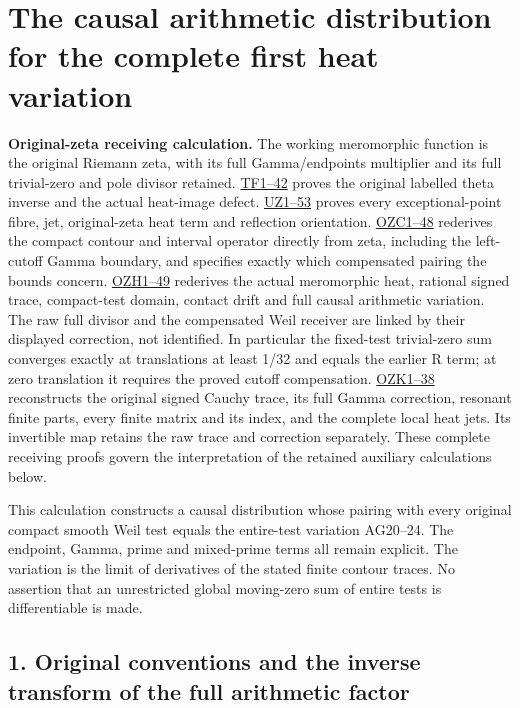\documentclass[
  10pt,
  a4paper,
]{article}
\author{}
\date{}
\begin{document}
{
\setcounter{tocdepth}{3}
\tableofcontents
}
\section{The causal arithmetic distribution for the complete first heat
variation}\label{the-causal-arithmetic-distribution-for-the-complete-first-heat-variation}

\textbf{Original-zeta receiving calculation.} The working meromorphic
function is the original Riemann zeta, with its full Gamma/endpoints
multiplier and its full trivial-zero and pole divisor retained.
\href{FAITHFUL_THETA_COMPLETION_RETURN.md}{TF1--42} proves the original
labelled theta inverse and the actual heat-image defect.
\href{FAITHFUL_UNCOMPLETED_ZETA_HEAT.md}{UZ1--53} proves every
exceptional-point fibre, jet, original-zeta heat term and reflection
orientation.
\href{ORIGINAL_ZETA_COMPACT_WEIL_RECONSTRUCTION.md}{OZC1--48} rederives
the compact contour and interval operator directly from zeta, including
the left-cutoff Gamma boundary, and specifies exactly which compensated
pairing the bounds concern.
\href{ORIGINAL_ZETA_HEAT_CONTACT_RECONSTRUCTION.md}{OZH1--49} rederives
the actual meromorphic heat, rational signed trace, compact-test domain,
contact drift and full causal arithmetic variation. The raw full divisor
and the compensated Weil receiver are linked by their displayed
correction, not identified. In particular the fixed-test trivial-zero
sum converges exactly at translations at least 1/32 and equals the
earlier R term; at zero translation it requires the proved cutoff
compensation. \href{ORIGINAL_ZETA_CAUCHY_RECONSTRUCTION.md}{OZK1--38}
reconstructs the original signed Cauchy trace, its full Gamma
correction, resonant finite parts, every finite matrix and its index,
and the complete local heat jets. Its invertible map retains the raw
trace and correction separately. These complete receiving proofs govern
the interpretation of the retained auxiliary calculations below.

This calculation constructs a causal distribution whose pairing with
every original compact smooth Weil test equals the entire-test variation
AG20--24. The endpoint, Gamma, prime and mixed-prime terms all remain
explicit. The variation is the limit of derivatives of the stated finite
contour traces. No assertion that an unrestricted global moving-zero sum
of entire tests is differentiable is made.

\subsection{1. Original conventions and the inverse transform of the
full arithmetic
factor}\label{original-conventions-and-the-inverse-transform-of-the-full-arithmetic-factor}
\end{document}
